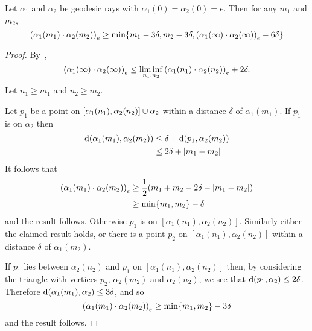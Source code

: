 \documentclass[a4paper]{article}
\begin{document}
\begin{lemma}\label{lem:boundary_gromov_product}
  Let $\alpha_1$ and $\alpha_2$ be geodesic rays with $\alpha_1(0) =
  \alpha_2(0) = e$. Then for any $m_1$ and $m_2$,
  \begin{equation*}
    \gromov{e}{\alpha_1(m_1)}{\alpha_2(m_2)} \geq 
        \min\{m_1 - 3\delta, m_2 - 3\delta, \gromov{e}{\alpha_1(\infty)}{\alpha_2(\infty)} - 6\delta\}
  \end{equation*}
\end{lemma}

\begin{proof}
  By~\cite{bridsonhaefliger99},
  \begin{equation*}
    \gromov{e}{\alpha_1(\infty)}{\alpha_2(\infty)} \leq \liminf_{n_1, n_2}
        \gromov{e}{\alpha_1(n_1)}{\alpha_2(n_2)} + 2\delta.
  \end{equation*}
  Let $n_1 \geq m_1$ and $n_2 \geq m_2$. 
  
  Let $p_1$ be a point on $[\alpha_1(n_1), \alpha_2(n_2)] \union \alpha_2$
  within a distance $\delta$ of $\alpha_1(m_1)$.  If $p_1$ is on $\alpha_2$
  then
  \begin{align*}
    \dist(\alpha_1(m_1), \alpha_2(m_2)) 
      & \leq \delta + \dist(p_1, \alpha_2(m_2)) \\
      & \leq 2\delta + \abs{m_1 - m_2}
  \end{align*}
  It follows that
  \begin{align*}
    \gromov{e}{\alpha_1(m_1)}{\alpha_2(m_2)} 
      &\geq \frac{1}{2}(m_1 + m_2 - 2\delta - \abs{m_1 - m_2})\\
      &\geq \min\{m_1, m_2\} - \delta
  \end{align*} 
  and the result follows. Otherwise $p_1$ is on $[\alpha_1(n_1),
  \alpha_2(n_2)]$. Similarly either the claimed result holds, or there is a
  point $p_2$ on $[\alpha_1(n_1), \alpha_2(n_2)]$ within a
  distance $\delta$ of $\alpha_1(m_2)$.
  
  If $p_1$ lies between $\alpha_2(n_2)$ and $p_1$ on $[\alpha_1(n_1),
  \alpha_2(n_2)]$ then, by considering the triangle with vertices $p_2$,
  $\alpha_2(m_2)$ and $\alpha_2(n_2)$, we see that $\dist(p_1, \alpha_2) \leq
  2\delta$. Therefore $\dist(\alpha_1(m_1), \alpha_2) \leq 3\delta$, and so
  \begin{equation*}
    \gromov{e}{\alpha_1(m_1)}{\alpha_2(m_2)} \geq \min\{m_1, m_2\} - 3\delta
  \end{equation*}
  and the result follows.


\end{proof}
\end{document}
